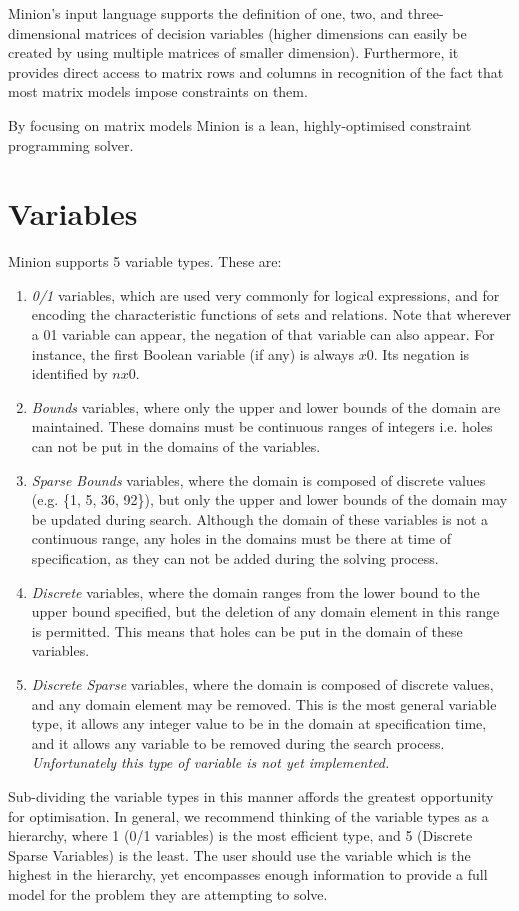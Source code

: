 \documentclass{article}
\begin{document}
\begin{small}
{\sc Minion}'s input language supports the definition of one, two, and
three-dimensional matrices of decision variables (higher dimensions
can easily be created by using multiple matrices of smaller
dimension).  Furthermore, it provides direct access to matrix rows and
columns in recognition of the fact that most matrix models impose
constraints on them.

By focusing on matrix models {\sc Minion} is a lean, highly-optimised
constraint programming solver.


\section{Variables}\label{sect_variables}

{\sc Minion} supports 5 variable types. These are: 
\begin{enumerate}
\item \emph{0/1} variables, which are used very commonly for logical
expressions, and for encoding the characteristic functions of sets and
relations. Note that wherever a 01 variable can appear, the negation
of that variable can also appear. For instance, the first Boolean
variable (if any) is always $x0$. Its negation is identified by $nx0$.
\item \emph{Bounds} variables, where only the upper and lower bounds
of the domain are maintained. These domains must be continuous ranges
of integers i.e. holes can not be put in the domains of the variables.
\item \emph{Sparse Bounds} variables, where the domain is composed of
discrete values (e.g. \{1, 5, 36, 92\}), but only the upper and lower
bounds of the domain may be updated during search. Although the domain
of these variables is not a continuous range, any holes in the domains
must be there at time of specification, as they can not be added
during the solving process.
\item \emph{Discrete} variables, where the domain ranges from the
lower bound to the upper bound specified, but the deletion of any
domain element in this range is permitted. This means that holes can
be put in the domain of these variables.
\item \emph{Discrete Sparse} variables, where the domain is composed of discrete values, and any domain element may be removed. This is the most general variable type, it allows any integer value to be in the domain at specification time, and it allows any variable to be removed during the search process.
{\emph{Unfortunately this type of variable is not yet implemented.}}
\end{enumerate}
Sub-dividing the variable types in this manner affords the greatest opportunity for optimisation. In general, we recommend thinking of the variable types as a hierarchy, where 1 (0/1 variables) is the most efficient type, and 5 (Discrete Sparse Variables) is the least. The user should use the variable which is the highest in the hierarchy, yet encompasses enough information to provide a full model for the problem they are attempting to solve.


\end{small}
\end{document}
